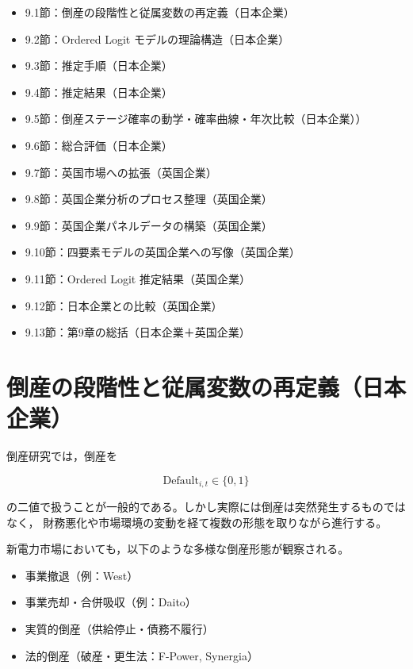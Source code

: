 \begin{itemize}
    \item 9.1節：倒産の段階性と従属変数の再定義（日本企業）
    \item 9.2節：Ordered Logit モデルの理論構造（日本企業）
    \item 9.3節：推定手順（日本企業）
    \item 9.4節：推定結果（日本企業）
    \item 9.5節：倒産ステージ確率の動学・確率曲線・年次比較（日本企業））
    \item 9.6節：総合評価（日本企業）
    \item 9.7節：英国市場への拡張（英国企業）
    \item 9.8節：英国企業分析のプロセス整理（英国企業）
    \item 9.9節：英国企業パネルデータの構築（英国企業）
    \item 9.10節：四要素モデルの英国企業への写像（英国企業）
    \item 9.11節：Ordered Logit 推定結果（英国企業）
    \item 9.12節：日本企業との比較（英国企業）
    \item 9.13節：第9章の総括（日本企業＋英国企業）
\end{itemize}



\section{倒産の段階性と従属変数の再定義（日本企業）}

倒産研究では，倒産を



\[
\text{Default}_{i,t} \in \{0,1\}
\]



の二値で扱うことが一般的である。しかし実際には倒産は突然発生するものではなく，
財務悪化や市場環境の変動を経て複数の形態を取りながら進行する。

新電力市場においても，以下のような多様な倒産形態が観察される。

\begin{itemize}
    \item 事業撤退（例：West）
    \item 事業売却・合併吸収（例：Daito）
    \item 実質的倒産（供給停止・債務不履行）
    \item 法的倒産（破産・更生法：F-Power, Synergia）
\end{itemize}

